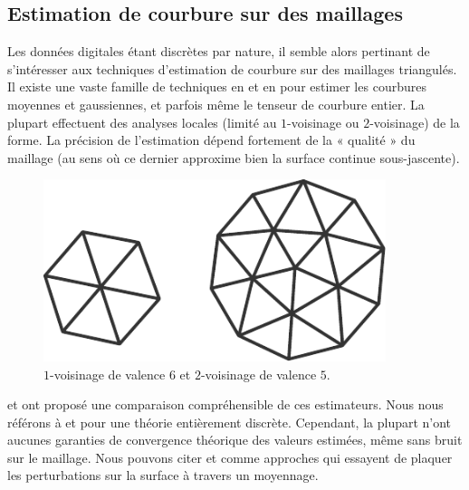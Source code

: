 \subsection{Estimation de courbure sur des maillages}
%
Les données digitales étant discrètes par nature, il semble alors pertinant de
s'intéresser aux techniques d'estimation de courbure sur des maillages
triangulés. Il existe une vaste famille de techniques en \ComputerGraphics et en
\GeometryProcessing pour estimer les courbures moyennes et gaussiennes, et
parfois même le tenseur de courbure entier. La plupart effectuent des analyses
locales (\cad limité au $1$-voisinage ou $2$-voisinage) de la forme. La
précision de l'estimation dépend fortement de la « qualité » du maillage (au
sens où ce dernier approxime bien la surface continue sous-jascente).
%
\begin{figure}[ht]
    \begin{center}
      \includegraphics[width=10cm]{figures/OneRingNeighborhood}
    \end{center}
    \caption[$1$-voisinage et $2$-voisinage.]{$1$-voisinage de valence $6$ et
    $2$-voisinage de valence $5$.}
    \label{fig:one-ring-neighborhood}
\end{figure}
%
%
 et  ont
proposé une comparaison compréhensible de ces estimateurs. Nous nous
référons à  et 
pour une théorie entièrement discrète. Cependant, la plupart n'ont aucunes
garanties de convergence théorique des valeurs estimées, même sans bruit sur le
maillage. Nous pouvons citer \cite{Page2002} et \cite{Rusinkiewicz2004} comme
approches qui essayent de plaquer les perturbations sur la surface à travers un
moyennage.
%
